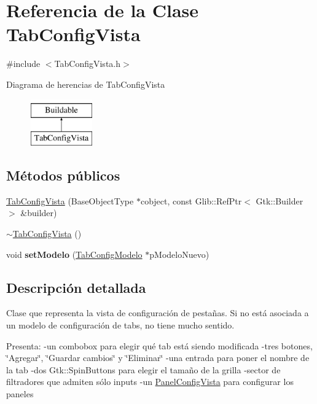 \hypertarget{classTabConfigVista}{\section{\-Referencia de la \-Clase \-Tab\-Config\-Vista}
\label{classTabConfigVista}
}


{\ttfamily \#include $<$\-Tab\-Config\-Vista.\-h$>$}

\-Diagrama de herencias de \-Tab\-Config\-Vista\begin{figure}[H]
\begin{center}
\leavevmode
\includegraphics[height=2.000000cm]{classTabConfigVista}
\end{center}
\end{figure}
\subsection*{\-Métodos públicos}
\begin{DoxyCompactItemize}
\item 
\hyperlink{classTabConfigVista_aa4d46efa51b167bac088aa7d641be8d0}{\-Tab\-Config\-Vista} (\-Base\-Object\-Type $\ast$cobject, const \-Glib\-::\-Ref\-Ptr$<$ \-Gtk\-::\-Builder $>$ \&builder)
\item 
\hyperlink{classTabConfigVista_a42de754ff67f5bb989d3207e39665dc7}{$\sim$\-Tab\-Config\-Vista} ()
\item 
\hypertarget{classTabConfigVista_a2ab4840c1ef2e5da4167e37f5e8bcac3}{void {\bfseries set\-Modelo} (\hyperlink{classTabConfigModelo}{\-Tab\-Config\-Modelo} $\ast$p\-Modelo\-Nuevo)}\label{classTabConfigVista_a2ab4840c1ef2e5da4167e37f5e8bcac3}

\end{DoxyCompactItemize}


\subsection{\-Descripción detallada}
\-Clase que representa la vista de configuración de pestañas. \-Si no está asociada a un modelo de configuración de tabs, no tiene mucho sentido.

\-Presenta\-: -\/un combobox para elegir qué tab está siendo modificada -\/tres botones, \char`\"{}\-Agregar\char`\"{}, \char`\"{}\-Guardar cambios\char`\"{} y \char`\"{}\-Eliminar\char`\"{} -\/una entrada para poner el nombre de la tab -\/dos \-Gtk\-::\-Spin\-Buttons para elegir el tamaño de la grilla -\/sector de filtradores que admiten sólo inputs -\/un \hyperlink{classPanelConfigVista}{\-Panel\-Config\-Vista} para configurar los paneles 

